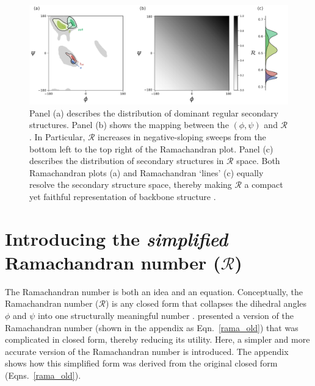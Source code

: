 \documentclass[fleqn,10pt,lineno]{wlpeerj} %
\newcommand{\Eqn}[1]{Eqn.~\ref{#1}}
\newcommand{\Eqns}[1]{Eqns.~\ref{#1}}
\newcommand{\n}[1]{{\color{red}#1}}
\newcommand{\rr}{$\mathcal{R}$\xspace}
\begin{document}
\begin{figure}[t!]
\begin{adjustwidth}{-1in}{0in} %
\centering
\includegraphics[width=0.9\linewidth]{automated_figures/fig_ss_2d_1d.pdf}
\caption{\n{Panel (a) describes the } distribution of dominant regular secondary \n{structures. Panel (b) shows the mapping between the $(\phi,\psi)$ and \rr. In Particular, \rr increases in negative-sloping sweeps from the bottom left to the top right of the Ramachandran plot. Panel (c) describes the distribution of secondary structures in \rr space. Both} Ramachandran plots (a) and Ramachandran `lines' (\n{c}) equally resolve the secondary structure space, thereby making \rr a compact yet faithful representation of backbone structure \citep{Mannige2016}.\label{fig:ramasecondary}} 
\end{adjustwidth}
\end{figure}

\section*{Introducing the \textit{simplified} Ramachandran number ($\mathcal{R}$)}

The Ramachandran number is both an idea and an equation. Conceptually, 
the Ramachandran number ($\mathcal{R}$) is any closed form that 
collapses the dihedral angles $\phi$ and $\psi$ into one structurally 
meaningful number \citep{Mannige2016}. \cite{Mannige2016} presented a 
version of the Ramachandran number (shown in the appendix as \Eqn{rama_old}) that was complicated in closed form, \n{thereby} reducing its utility. Here, a simpler and \n{more} accurate version of the Ramachandran number is introduced. \n{The appendix} shows how this simplified form was derived from the original closed form (\Eqns{rama_old}).
\end{document}
